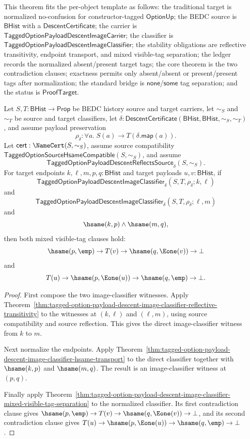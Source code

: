 \begin{theorem}
\label{thm:tagged-option-payload-descent-image-classifier-reflective-transitive-normalized-mixed-visible-tag-separation}
This theorem fits the per-object template as follows: the traditional target is
normalized no-confusion for constructor-tagged $\mathsf{OptionUp}$; the BEDC
source is $\mathsf{BHist}$ with a $\mathsf{DescentCertificate}$; the carrier is
$\mathsf{TaggedOptionPayloadDescentImageCarrier}$; the classifier is
$\mathsf{TaggedOptionPayloadDescentImageClassifier}$; the stability obligations
are reflective transitivity, endpoint transport, and mixed visible-tag
separation; the ledger records the normalized absent/present target tags; the
core theorem is the two contradiction clauses; exactness permits only
absent/absent or present/present tags after normalization; the standard bridge
is $\mathsf{none}$/$\mathsf{some}$ tag separation; and the status is
$\mathsf{ProofTarget}$.

Let $S,T:\mathsf{BHist}\to\mathsf{Prop}$ be BEDC history source and target
carriers, let $\sim_S$ and $\sim_T$ be source and target classifiers, let
$\delta:\mathsf{DescentCertificate}(\mathsf{BHist},\mathsf{BHist},\sim_S,\sim_T)$,
and assume payload preservation
$$
\rho_{\delta}:\forall a.\;S(a)\to T(\delta.\mathsf{map}(a)).
$$
Let $\mathsf{cert}:\NameCert(S,\sim_S)$, assume source compatibility
$\mathsf{TaggedOptionSourceHsameCompatible}(S,\sim_S)$, and assume
$$
\mathsf{TaggedOptionPayloadDescentReflectsSource}_{\delta}(S,\sim_S).
$$
For target endpoints $k,\ell,m,p,q:\mathsf{BHist}$ and target payloads
$u,v:\mathsf{BHist}$, if
$$
\mathsf{TaggedOptionPayloadDescentImageClassifier}_{\delta}
(S,T,\rho_{\delta};k,\ell)
$$
and
$$
\mathsf{TaggedOptionPayloadDescentImageClassifier}_{\delta}
(S,T,\rho_{\delta};\ell,m)
$$
and
$$
\hsame(k,p)\land \hsame(m,q),
$$
then both mixed visible-tag clauses hold:
$$
\hsame(p,\emp)\to T(v)\to \hsame(q,\Eone(v))\to\bot
$$
and
$$
T(u)\to \hsame(p,\Eone(u))\to \hsame(q,\emp)\to\bot.
$$
\end{theorem}
\begin{proof}
First compose the two image-classifier witnesses. Apply
Theorem~\ref{thm:tagged-option-payload-descent-image-classifier-reflective-transitivity}
to the witnesses at $(k,\ell)$ and $(\ell,m)$, using source compatibility and
source reflection. This gives the direct image-classifier witness from $k$ to
$m$.

Next normalize the endpoints. Apply
Theorem~\ref{thm:tagged-option-payload-descent-image-classifier-hsame-transport}
to the direct classifier together with $\hsame(k,p)$ and $\hsame(m,q)$. The
result is an image-classifier witness at $(p,q)$.

Finally apply
Theorem~\ref{thm:tagged-option-payload-descent-image-classifier-mixed-visible-tag-separation}
to the normalized classifier. Its first contradiction clause gives
$\hsame(p,\emp)\to T(v)\to \hsame(q,\Eone(v))\to\bot$, and its second
contradiction clause gives
$T(u)\to \hsame(p,\Eone(u))\to \hsame(q,\emp)\to\bot$.
\end{proof}

